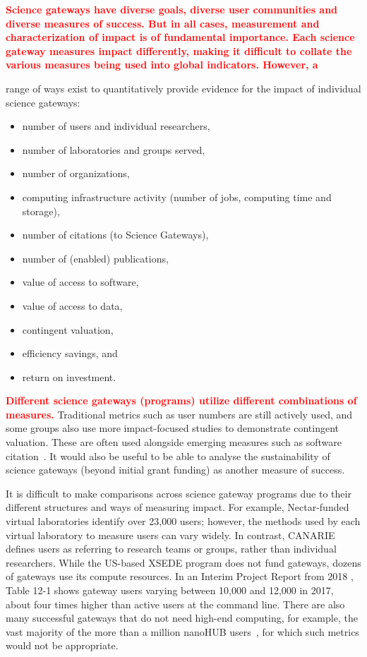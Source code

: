 \documentclass[review]{elsarticle}
\newcommand{\changedtext}[1]{
	\textcolor{red}{\textbf{#1}}
}
\begin{document}
\changedtext{Science gateways have diverse goals, diverse user communities and diverse measures of success. 
But in all cases, measurement and characterization of impact is of fundamental importance.
Each science gateway measures impact differently, making it difficult to collate the various measures being used into global indicators. However, a} 
 range of ways exist to quantitatively provide evidence for the impact of individual science gateways:
\begin{itemize}
	\item number of users and individual researchers,
	\item number of laboratories and groups served,
	\item number of organizations,
	\item computing infrastructure activity (number of jobs, computing time and storage),
	\item number of  citations (to Science Gateways),
	\item number of  (enabled) publications,
	\item value of access to software,
	\item value of access to data,
	\item contingent valuation,
	\item efficiency savings, and
	\item return on investment.
\end{itemize}

\changedtext{Different science gateways (programs) utilize different combinations of measures.} Traditional metrics such as user numbers are still actively used, and some groups also use more impact-focused studies to demonstrate contingent valuation. These are often used alongside emerging measures such as software citation~\cite{force11-32}. 
It would also be useful to be able to analyse the sustainability of science gateways (beyond initial grant funding) as another measure of success.


It is difficult to make comparisons across science gateway programs due to their different structures and ways of measuring impact. For example, Nectar-funded virtual laboratories identify over 23,000 users; however, the methods used by each virtual laboratory to measure users can vary widely. In contrast, CANARIE defines users as referring to research teams or groups, rather than individual researchers. 
While the US-based XSEDE program does not fund gateways, dozens of gateways use its compute resources. 
In an Interim Project Report from 2018 \cite{xsede-85}, Table 12-1 shows gateway users varying between 10,000 and 12,000 in 2017, about four times higher than active users at the command line.  There are also many successful gateways that do not need high-end computing, for example, the vast majority of the more than a million nanoHUB users~\cite{nanohub-33}, for which such metrics would not be appropriate.
\end{document}
